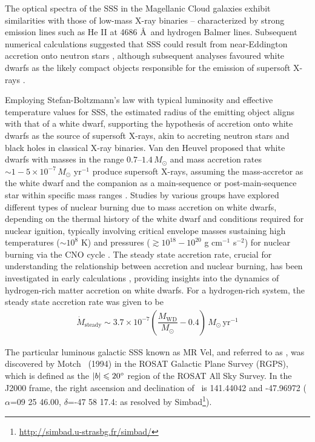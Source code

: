     	The optical spectra of the SSS in the Magellanic Cloud galaxies exhibit similarities with those of low-mass X-ray binaries -- characterized by strong emission lines such as He II at 4686 \AA\ and hydrogen Balmer lines. Subsequent numerical calculations suggested that SSS could result from near-Eddington accretion onto neutron stars \cite{kylafis93}, although subsequent analyses favoured white dwarfs as the likely compact objects responsible for the emission of supersoft X-rays \cite{van1992accreting}.
    	
    	Employing Stefan-Boltzmann's law with typical luminosity and effective temperature values for SSS, the estimated radius of the emitting object aligns with that of a white dwarf, supporting the hypothesis of accretion onto white dwarfs as the source of supersoft X-rays, akin to accreting neutron stars and black holes in classical X-ray binaries. Van den Heuvel proposed that white dwarfs with masses in the range $0.7–1.4\,M_\odot$ and mass accretion rates $\sim 1-5\times 10^{-7}\,M_\odot\text{ yr}^{-1}$ produce supersoft X-rays, assuming the mass-accretor as the white dwarf and the companion as a main-sequence or post-main-sequence star within specific mass ranges \cite{van1992accreting}. Studies by various groups have explored different types of nuclear burning due to mass accretion on white dwarfs, depending on the thermal history of the white dwarf and conditions required for nuclear ignition, typically involving critical envelope masses %
    sustaining high temperatures ($\sim 10^8$ K) and pressures ($\gtrsim 10^{18}-10^{20}$ g cm$^{-1}$ s$^{-2}$) for nuclear burning via the CNO cycle \cite{paczynski78,prialnik78,sion79,sienkiewicz80,nomoto82,fujimoto82a,fujimoto82b,iben82,prialnik95,macdonald83}. The steady state accretion rate, crucial for understanding the relationship between accretion and nuclear burning, has been investigated in early calculations \cite{paczynski80,iben82}, providing insights into the dynamics of hydrogen-rich matter accretion on white dwarfs. For a hydrogen-rich system, the steady state accretion rate was given to be \cite{hachisu2001}
		\begin{align}
			\dot{M}_\text{steady}\sim 3.7\times 10^{-7}\left( \dfrac{M_\text{WD}}{M_\odot}-0.4 \right)\,M_\odot\,\text{yr}^{-1} \label{eqn:steady-mass-accr}
		\end{align}
	
		The particular luminous galactic SSS known as MR Vel, and referred to as \source, was discovered by Motch \etal\ (1994) \cite{motch1994} in the ROSAT Galactic Plane Survey (RGPS), which  is defined as the $|b|\leqslant 20\degree$ region of the ROSAT All Sky Survey. In the J2000 frame, the right ascension and declination of \source\ is 141.44042 and -47.96972 ($\alpha$=09 25 46.00, $\delta$=-47 58 17.4: as resolved by Simbad\footnote{\url{http://simbad.u-strasbg.fr/simbad/}}).
		
